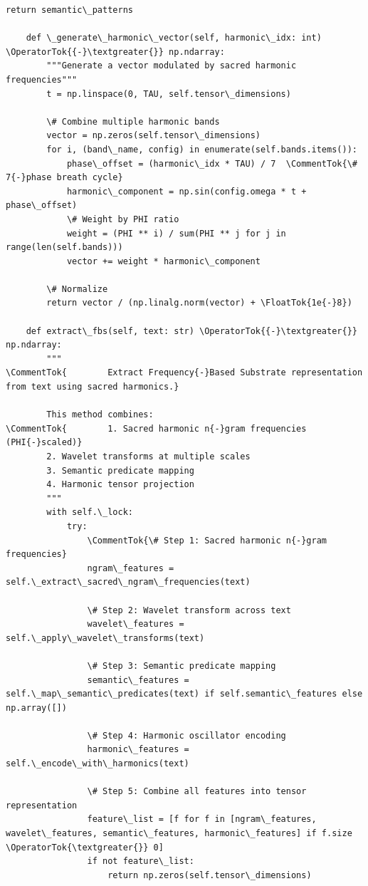 \documentclass[12pt]{article}
\begin{document}
\begin{lstlisting}[basicstyle=\ttfamily\small]
        return semantic\_patterns
    
    def \_generate\_harmonic\_vector(self, harmonic\_idx: int) \OperatorTok{{-}\textgreater{}} np.ndarray:
        """Generate a vector modulated by sacred harmonic frequencies"""
        t = np.linspace(0, TAU, self.tensor\_dimensions)
        
        \# Combine multiple harmonic bands
        vector = np.zeros(self.tensor\_dimensions)
        for i, (band\_name, config) in enumerate(self.bands.items()):
            phase\_offset = (harmonic\_idx * TAU) / 7  \CommentTok{\# 7{-}phase breath cycle}
            harmonic\_component = np.sin(config.omega * t + phase\_offset)
            \# Weight by PHI ratio
            weight = (PHI ** i) / sum(PHI ** j for j in range(len(self.bands)))
            vector += weight * harmonic\_component
        
        \# Normalize
        return vector / (np.linalg.norm(vector) + \FloatTok{1e{-}8})
    
    def extract\_fbs(self, text: str) \OperatorTok{{-}\textgreater{}} np.ndarray:
        """
\CommentTok{        Extract Frequency{-}Based Substrate representation from text using sacred harmonics.}
        
        This method combines:
\CommentTok{        1. Sacred harmonic n{-}gram frequencies (PHI{-}scaled)}
        2. Wavelet transforms at multiple scales
        3. Semantic predicate mapping
        4. Harmonic tensor projection
        """
        with self.\_lock:
            try:
                \CommentTok{\# Step 1: Sacred harmonic n{-}gram frequencies}
                ngram\_features = self.\_extract\_sacred\_ngram\_frequencies(text)
                
                \# Step 2: Wavelet transform across text
                wavelet\_features = self.\_apply\_wavelet\_transforms(text)
                
                \# Step 3: Semantic predicate mapping
                semantic\_features = self.\_map\_semantic\_predicates(text) if self.semantic\_features else np.array([])
                
                \# Step 4: Harmonic oscillator encoding
                harmonic\_features = self.\_encode\_with\_harmonics(text)
                
                \# Step 5: Combine all features into tensor representation
                feature\_list = [f for f in [ngram\_features, wavelet\_features, semantic\_features, harmonic\_features] if f.size \OperatorTok{\textgreater{}} 0]
                if not feature\_list:
                    return np.zeros(self.tensor\_dimensions)
                

\end{lstlisting}
\end{document}
